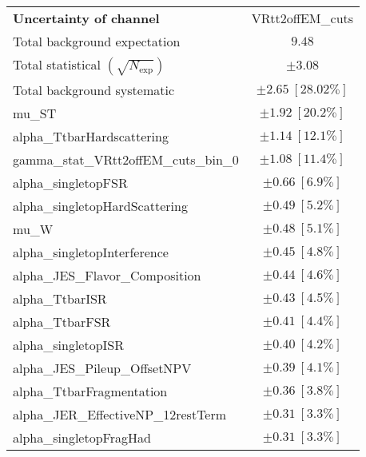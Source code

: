 
\begin{table}
\begin{center}
\setlength{\tabcolsep}{0.0pc}
\begin{tabular*}{\textwidth}{@{\extracolsep{\fill}}lc}
\noalign{\smallskip}\hline\noalign{\smallskip}
{\textbf{Uncertainty of channel}}                                    & VRtt2offEM\_cuts            \\
\noalign{\smallskip}\hline\noalign{\smallskip}
Total background expectation             &  $9.48$       \\
\noalign{\smallskip}\hline\noalign{\smallskip}
Total statistical $(\sqrt{N_{\mathrm{exp}}})$              & $\pm 3.08$       \\
Total background systematic               & $\pm 2.65\ [28.02\%] $             \\
\noalign{\smallskip}\hline\noalign{\smallskip}
\noalign{\smallskip}\hline\noalign{\smallskip}
mu\_ST         & $\pm 1.92\ [20.2\%] $       \\
alpha\_TtbarHardscattering         & $\pm 1.14\ [12.1\%] $       \\
gamma\_stat\_VRtt2offEM\_cuts\_bin\_0         & $\pm 1.08\ [11.4\%] $       \\
alpha\_singletopFSR         & $\pm 0.66\ [6.9\%] $       \\
alpha\_singletopHardScattering         & $\pm 0.49\ [5.2\%] $       \\
mu\_W         & $\pm 0.48\ [5.1\%] $       \\
alpha\_singletopInterference         & $\pm 0.45\ [4.8\%] $       \\
alpha\_JES\_Flavor\_Composition         & $\pm 0.44\ [4.6\%] $       \\
alpha\_TtbarISR         & $\pm 0.43\ [4.5\%] $       \\
alpha\_TtbarFSR         & $\pm 0.41\ [4.4\%] $       \\
alpha\_singletopISR         & $\pm 0.40\ [4.2\%] $       \\
alpha\_JES\_Pileup\_OffsetNPV         & $\pm 0.39\ [4.1\%] $       \\
alpha\_TtbarFragmentation         & $\pm 0.36\ [3.8\%] $       \\
alpha\_JER\_EffectiveNP\_12restTerm         & $\pm 0.31\ [3.3\%] $       \\
alpha\_singletopFragHad         & $\pm 0.31\ [3.3\%] $       \\

\end{tabular*}
\end{center}
\end{table}
